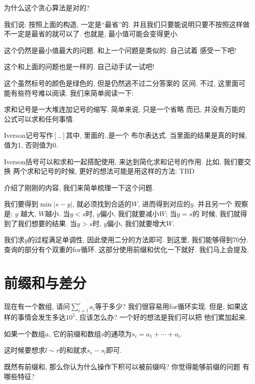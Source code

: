 \begin{ques}
    为什么这个贪心算法是对的? 
\end{ques}

我们说: 按照上面的构造, 一定是``最省''的. 并且我们只要能说明只要不按照这样做
不一定是最省的就可以了. 也就是, 最小值可能会变得更小. 

  这个仍然是最小值最大的问题. 和上一个问题是类似的. 自己试着
感受一下吧!

 这个和上面的问题也是一样的. 自己动手试一试吧! 

 这个虽然标号的颜色是绿色的, 但是仍然逃不过二分答案的
区间. 不过, 这里面可能有些符号难以阅读. 我们来简单阅读一下: 

 求和记号是一大堆连加记号的缩写. 简单来说, 只是一个省略
而已, 并没有万能的公式可以求和任何事情. 

 Iverson记号写作$[..]$其中, 里面的$..$是一个
布尔表达式. 当里面的结果是真的时候, 值为1, 否则值为0. 

Iverson括号可以和求和一起搭配使用, 来达到简化求和记号的作用. 比如, 我们要交换
两个求和记号的时候, 更好的想法可能是用这样的方法: TBD 

介绍了刚刚的内容, 我们来简单梳理一下这个问题. 

我们要得到$\min |s-y|$, 就必须找到合适的$W$, 进而得到对应的$y$. 并且另一个
观察是: $y$ 越大, $W$越小. 当$y<s$时, $y$偏小, 我们就要减小$W$; 当$y=s$的
时候, 我们就得到了我们想要的结果. 当$y>s$时, $y$偏小, 我们就要增大$W$. 

我们求$y$的过程满足单调性, 因此使用二分的方法即可. 到这里, 我们能够得到70分. 
查询的部分有个双重的for循环. 这部分使用前缀和优化一下就好. 我们马上会提及. 

\section{前缀和与差分}

现在有一个数组, 请问$\sum_{i=l}^r a_i$等于多少? 我们很容易用for循环实现. 
但是, 如果这样的事情会发生多达$10^5$, 应该怎么办? 一个好的想法是我们可以把
他们累加起来. 

\begin{definition}
    如果一个数组$a$, 它的前缀和数组$s$的通项为$s_i = a_1 + \cdots + a_i$. 
\end{definition}

这时候要想求$l\sim r$的和就求$s_r - s_l$即可. 

\begin{ques}
    既然有前缀和, 那么你认为什么操作下积可以被前缀吗? 你觉得能够前缀的问题
    有哪些特征?  
\end{ques}

